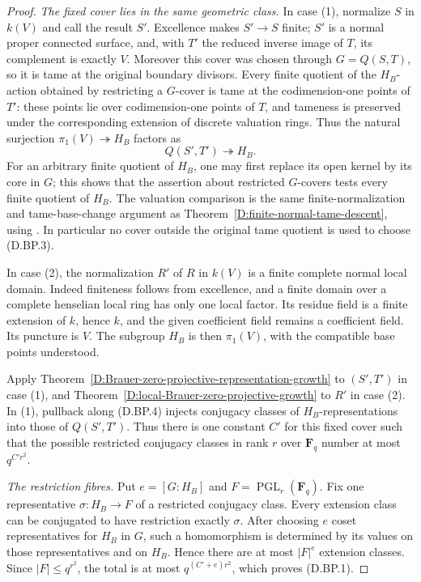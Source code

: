 \begin{proof}
\emph{The fixed cover lies in the same geometric class.}
In case (1), normalize $S$ in $k(V)$ and call the result
$S'$.  Excellence makes $S'\to S$ finite; $S'$ is a normal
proper connected surface, and, with $T'$ the reduced inverse
image of $T$, its complement is exactly $V$.  Moreover this
cover was chosen through $G=Q(S,T)$, so it is tame at the
original boundary divisors.  Every finite quotient of the
$H_B$-action obtained by restricting a $G$-cover is tame at
the codimension-one points of $T'$: these points lie over
codimension-one points of $T$, and tameness is preserved
under the corresponding extension of discrete valuation
rings.  Thus the natural surjection
$\pi_1(V)\twoheadrightarrow H_B$ factors as
\[
               Q(S',T')\twoheadrightarrow H_B.
                                                        \tag{D.BP.4}
\]
For an arbitrary finite quotient of $H_B$, one may first
replace its open kernel by its core in $G$; this shows that
the assertion about restricted $G$-covers tests every
finite quotient of $H_B$.  The valuation comparison is the
same finite-normalization and tame-base-change argument as
Theorem~\ref{D:finite-normal-tame-descent}, using
\citep[Lemma~15.116.9(2), Tag 0EXY]{StacksDFiniteTameDescent}.
In particular no cover outside the original tame quotient
is used to choose (D.BP.3).

In case (2), the normalization $R'$ of $R$ in $k(V)$ is a
finite complete normal local domain.  Indeed finiteness
follows from excellence, and a finite domain over a
complete henselian local ring has only one local factor.
Its residue field is a finite extension of $k$, hence $k$,
and the given coefficient field remains a coefficient
field.  Its puncture is $V$.  The subgroup $H_B$ is then
$\pi_1(V)$, with the compatible base points understood.

Apply Theorem~\ref{D:Brauer-zero-projective-representation-growth}
to $(S',T')$ in case (1), and
Theorem~\ref{D:local-Brauer-zero-projective-growth} to $R'$
in case (2).  In (1), pullback along (D.BP.4) injects
conjugacy classes of $H_B$-representations into those of
$Q(S',T')$.  Thus there is one constant $C'$ for this fixed
cover such that the possible restricted conjugacy classes
in rank $r$ over $\mathbf F_q$ number at most
$q^{C'r^2}$.

\emph{The restriction fibres.}
Put $e=[G:H_B]$ and $F=\operatorname{PGL}_r(\mathbf F_q)$.
Fix one representative $\sigma:H_B\to F$ of a restricted
conjugacy class.  Every extension class can be conjugated
to have restriction exactly $\sigma$.  After choosing $e$
coset representatives for $H_B$ in $G$, such a homomorphism
is determined by its values on those representatives and
on $H_B$.  Hence there are at most $|F|^e$ extension
classes.  Since $|F|\le q^{r^2}$, the total is at most
$q^{(C'+e)r^2}$, which proves (D.BP.1).
\end{proof}

